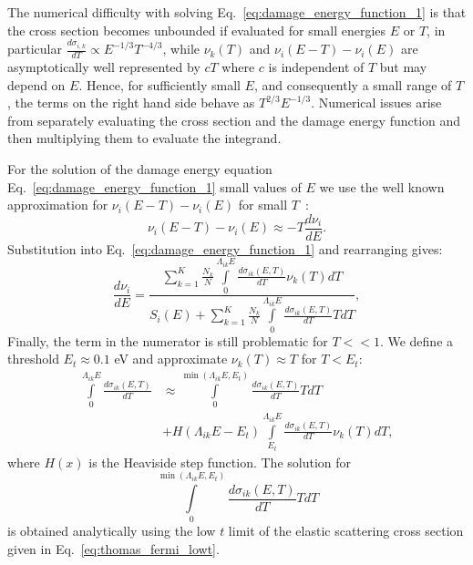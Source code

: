 \documentclass[review]{elsarticle}
\begin{document}
The numerical difficulty with solving Eq.~\ref{eq:damage_energy_function_1} is that the cross section becomes unbounded if evaluated for small energies $E$ or $T$, in particular $ \frac{d \sigma_{i,k}}{dT} \propto E^{-1/3} T^{-4/3}$, while $\nu_k(T)$ and $\nu_i(E-T) - \nu_i(E)$ are asymptotically well represented by $c T$ where $c$ is independent of $T$ but may depend on $E$. Hence, for sufficiently small $E$, and consequently a small range of $T$, the terms on the right hand side behave as $T^{2/3} E^{-1/3}$. Numerical issues arise from separately evaluating the cross section and the damage energy function and then multiplying them to evaluate the integrand. 

For the solution of the damage energy equation Eq.~\ref{eq:damage_energy_function_1}  small values of $E$ we use the well known approximation for $\nu_i(E-T) - \nu_i(E)$ for small $T$~\cite{PC1980}:
\begin{equation}
   \nu_i(E-T) - \nu_i(E) \approx -T \frac{d\nu_i}{dE}.
\end{equation}
Substitution into Eq.~\ref{eq:damage_energy_function_1} and rearranging gives:
\begin{equation}\label{eq:damage_energy_function_approx_1}
    \frac{d \nu_i}{dE} 
      =\frac{ \sum\limits_{k=1}^K   \frac{N_k}{N} \int\limits_{0}^{\Lambda_{ik} E}  \frac{d \sigma_{ik} (E,T)}{dT}  
 \nu_k(T)  dT}{ S_i(E) +  \sum\limits_{k=1}^K   \frac{N_k}{N} \int\limits_{0}^{\Lambda_{ik} E} \frac{d \sigma_{ik} (E,T)}{dT}  T dT  },
\end{equation}
Finally, the term in the numerator is still problematic for $T << 1$. We define a threshold $E_t \approx 0.1$ eV and approximate $\nu_k(T) \approx T$ for $T < E_t$:
\begin{align}
 \int\limits_{0}^{\Lambda_{ik} E}  \frac{d \sigma_{ik} (E,T)}{dT}  &\approx  \int\limits_{0}^{\min(\Lambda_{ik} E, E_t)}  \frac{d \sigma_{ik} (E,T)}{dT} T dT
 \nonumber \\
      &+  H(\Lambda_{ik} E - E_t) \int\limits_{E_t}^{\Lambda_{ik} E}  \frac{d \sigma_{ik} (E,T)}{dT}   \nu_k(T)  dT,
\end{align}
where $H(x)$ is the Heaviside step function. The solution for 
\[
  \int\limits_{0}^{\min(\Lambda_{ik} E, E_t)}  \frac{d \sigma_{ik} (E,T)}{dT} T dT
\]
is obtained analytically using the low $t$ limit of the elastic scattering cross section given in Eq.~\ref{eq:thomas_fermi_lowt}.
\end{document}

